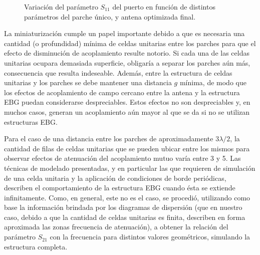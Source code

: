 \begin{figure}[h]
	\centering 
	\hspace{30pt}
	\hspace{30pt}
	\hspace{30pt}
	\caption{Variación del parámetro $S_{11}$ del puerto en función de distintos parámetros del parche único, y antena optimizada final.}
	\label{fig:posibles-geometrias}
\end{figure}

La miniaturización cumple un papel importante debido a que es necesaria una cantidad (o profundidad) mínima de celdas unitarias entre los parches para que el efecto de disminución de acoplamiento resulte notorio. Si cada una de las celdas unitarias ocupara demasiada superficie, obligaría a separar los parches aún más, consecuencia que resulta indeseable. Además, entre la estructura de celdas unitarias y los parches se debe mantener una distancia $g$ mínima, de modo que los efectos de acoplamiento de campo cercano entre la antena y la estructura EBG puedan considerarse despreciables. Estos efectos no son despreciables y, en muchos casos, generan un acoplamiento aún mayor al que se da si no se utilizan estructuras EBG.

Para el caso de una distancia entre los parches de aproximadamente $3\lambda/2$, la cantidad de filas de celdas unitarias que se pueden ubicar entre los mismos para observar efectos de atenuación del acoplamiento mutuo varía entre 3 y 5. Las técnicas de modelado presentadas, y en particular las que requieren de simulación de una celda unitaria y la aplicación de condiciones de borde periódicas, describen el comportamiento de la estructura EBG cuando ésta se extiende infinitamente. Como, en general, este no es el caso, se procedió, utilizando como base la información brindada por los diagramas de dispersión (que en nuestro caso, debido a que la cantidad de celdas unitarias es finita, describen en forma aproximada las zonas frecuencia de atenuación), a obtener la relación del parámetro $S_{21}$ con la frecuencia para distintos valores geométricos, simulando la estructura completa.

